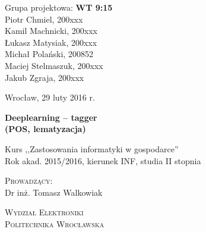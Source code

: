 \documentclass[a4paper, 11pt]{article}
\begin{document}
	
	\noindent
	\begin{minipage}[t]{.5\linewidth}
		\begin{flushleft}                           
			Grupa projektowa: \textbf{WT 9:15}\\
			\vspace{0.8cm}
			Piotr Chmiel, 200xxx\\
			Kamil Machnicki, 200xxx\\
			Łukasz Matysiak, 200xxx\\
			Michał Polański, 200852\\
			Maciej Stelmaszuk, 200xxx\\
			Jakub Zgraja, 200xxx\\
		\end{flushleft} 
	\end{minipage}%
	\begin{minipage}[t]{.5\linewidth}
		\begin{flushright}
			Wrocław, 29 luty 2016 r.\\
			\vspace{.35cm}

		\end{flushright}
	\end{minipage}
	
	\vspace{3.0cm}
	
	\begin{center}
		{\Huge\bf Deeplearning -- tagger}\\
		{\Large\bf (POS, lematyzacja)}\\
			
	\end{center}
	
	\begin{center}
		{\large Kurs ,,Zastosowania informatyki w gospodarce''}\\
		{\large Rok akad. 2015/2016, kierunek INF, studia II stopnia}
	\end{center}
	
	\vspace{2cm}
	\begin{center}
			\textsc{Prowadzący:}\\
			Dr inż. Tomasz Walkowiak
	\end{center}
	
	\thispagestyle{empty}
	
	\vfill
	\begin{center}
		{\Large \textsc{Wydział Elektroniki}}\\
		{\Large \textsc{Politechnika Wrocławska}}
	\end{center}
	
\end{document}
